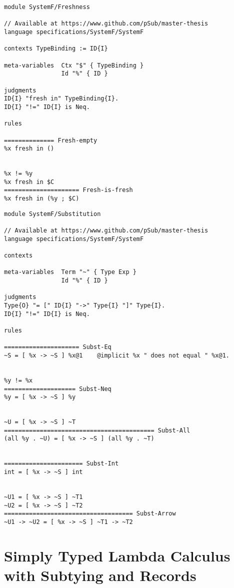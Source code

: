 \newpage
\begin{lstlisting}[language=sltc]
module SystemF/Freshness

// Available at https://www.github.com/pSub/master-thesis
language specifications/SystemF/SystemF

contexts TypeBinding := ID{I}

meta-variables  Ctx "$" { TypeBinding }
                Id "%" { ID }

judgments 
ID{I} "fresh in" TypeBinding{I}.
ID{I} "!=" ID{I} is Neq.

rules

============== Fresh-empty
%x fresh in ()


%x != %y
%x fresh in $C
===================== Fresh-is-fresh
%x fresh in (%y ; $C)
\end{lstlisting}
\newpage
\begin{lstlisting}[language=sltc]
module SystemF/Substitution

// Available at https://www.github.com/pSub/master-thesis
language specifications/SystemF/SystemF

contexts

meta-variables  Term "~" { Type Exp }
                Id "%" { ID }

judgments
Type{O} "= [" ID{I} "->" Type{I} "]" Type{I}.
ID{I} "!=" ID{I} is Neq.

rules

===================== Subst-Eq
~S = [ %x -> ~S ] %x@1    @implicit %x " does not equal " %x@1.


%y != %x
==================== Subst-Neq
%y = [ %x -> ~S ] %y


~U = [ %x -> ~S ] ~T
========================================== Subst-All
(all %y . ~U) = [ %x -> ~S ] (all %y . ~T)


====================== Subst-Int
int = [ %x -> ~S ] int


~U1 = [ %x -> ~S ] ~T1
~U2 = [ %x -> ~S ] ~T2
==================================== Subst-Arrow
~U1 -> ~U2 = [ %x -> ~S ] ~T1 -> ~T2
\end{lstlisting}

\newpage
\section{Simply Typed Lambda Calculus with Subtying and Records}
\label{appendix:stlc-records}

